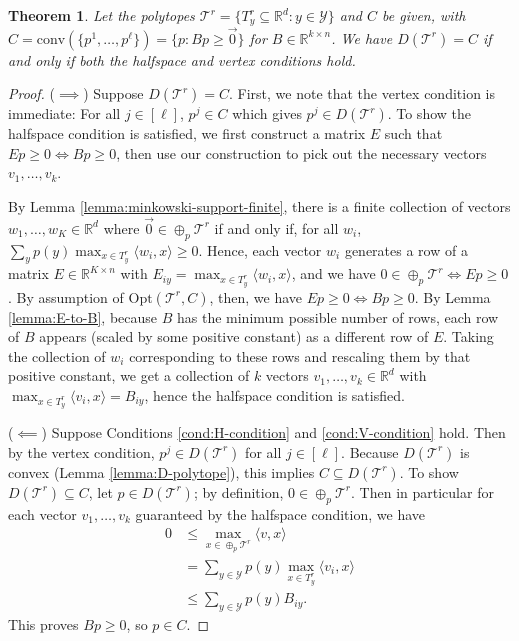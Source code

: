 \documentclass[12pt]{article}
\newcommand{\Opt}{\mathrm{Opt}}
\newcommand{\reals}{\mathbb{R}}
\newcommand{\T}{\mathcal{T}}
\newcommand{\Y}{\mathcal{Y}}
\newcommand{\inprod}[2]{\langle #1, #2 \rangle}%
\newcommand{\conv}{\mathrm{conv}}
\newtheorem{theorem}{Theorem}
\begin{document}
  \begin{theorem} \label{thm:vertex-halfspace-opt}
    Let the polytopes $\T^r = \{T^r_y \subseteq \reals^d : y \in \Y\}$ and $C$ be given, with $C = \conv(\{p^1,\ldots,p^{\ell}\}) = \{p: Bp \geq \vec 0\}$ for $B \in \reals^{k \times n}$.
    We have $D(\T^r) = C$ if and only if both the halfspace and vertex conditions hold.
  \end{theorem}
  \begin{proof}
    ($\implies$)
    Suppose $D(\T^r) = C$.
    First, we note that the vertex condition is immediate: For all $j \in [\ell]$, $p^j \in C$ which gives $p^j \in D(\T^r)$.
    To show the halfspace condition is satisfied, we first construct a matrix $E$ such that $Ep \geq 0 \iff Bp \geq 0$, then use our construction to pick out the necessary vectors $v_1,\dots,v_k$.

    By Lemma \ref{lemma:minkowski-support-finite}, there is a finite collection of vectors $w_1,\dots,w_{K} \in \reals^d$ where $\vec 0 \in \oplus_p \T^r$ if and only if, for all $w_i$, $\sum_y p(y) \max_{x \in T^r_y} \inprod{w_i}{x} \geq 0$.
    Hence, each vector $w_i$ generates a row of a matrix $E \in \reals^{K \times n}$ with $E_{iy} = \max_{x \in T^r_y} \inprod{w_i}{x}$, and we have $0 \in \oplus_p \T^r \iff Ep \geq 0$.
    By assumption of $\Opt(\T^r,C)$, then, we have $Ep \geq 0 \iff Bp \geq 0$.
    By Lemma \ref{lemma:E-to-B}, because $B$ has the minimum possible number of rows, each row of $B$ appears (scaled by some positive constant) as a different row of $E$. Taking the collection of $w_i$ corresponding to these rows and rescaling them by that positive constant, we get a collection of $k$ vectors $v_1,\ldots,v_k \in \reals^d$ with $\max_{x \in T^r_y} \inprod{v_i}{x} = B_{iy}$, hence the halfspace condition is satisfied.

    ($\impliedby$)
    Suppose Conditions \ref{cond:H-condition} and \ref{cond:V-condition} hold.
    Then by the vertex condition, $p^j \in D(\T^r)$ for all $j \in [\ell]$.
    Because $D(\T^r)$ is convex (Lemma \ref{lemma:D-polytope}), this implies $C \subseteq D(\T^r)$.
    To show $D(\T^r) \subseteq C$, let $p \in D(\T^r)$; by definition, $0 \in \oplus_p \T^r$.
    Then in particular for each vector $v_1,\ldots,v_k$ guaranteed by the halfspace condition, we have
    \begin{align*}
      0 &\leq \max_{x \in \oplus_p \T^r} \inprod{v}{x}  \\
        &=    \sum_{y \in \Y} p(y) \max_{x \in T^r_y} \inprod{v_i}{x}  \\
        &\leq \sum_{y \in \Y} p(y) B_{iy} .
    \end{align*}
    This proves $Bp \geq 0$, so $p \in C$.
  \end{proof}
\end{document}
